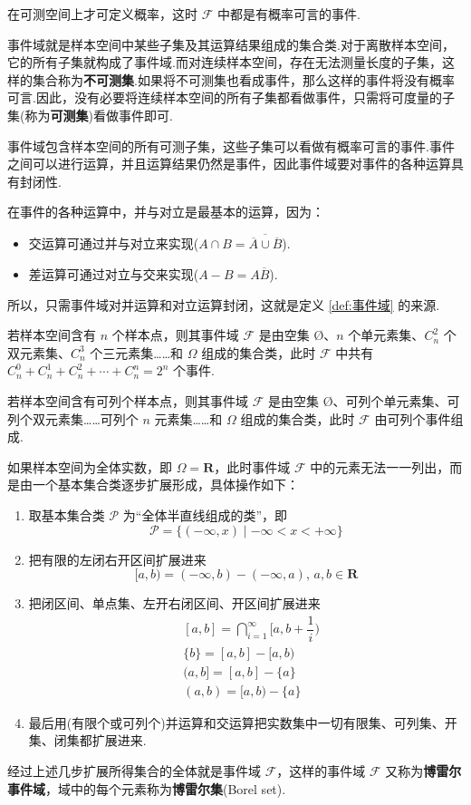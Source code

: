 在可测空间上才可定义概率，这时 $\mathcal{F}$ 中都是有概率可言的事件.

\begin{note}
    \indent 事件域就是样本空间中某些子集及其运算结果组成的集合类.对于离散样本空间，它的所有子集就构成了事件域.而对连续样本空间，存在无法测量长度的子集，这样的集合称为\textbf{不可测集}.如果将不可测集也看成事件，那么这样的事件将没有概率可言.因此，没有必要将连续样本空间的所有子集都看做事件，只需将可度量的子集(称为\textbf{可测集})看做事件即可.

    \indent 事件域包含样本空间的所有可测子集，这些子集可以看做有概率可言的事件.事件之间可以进行运算，并且运算结果仍然是事件，因此事件域要对事件的各种运算具有封闭性.

    \indent 在事件的各种运算中，并与对立是最基本的运算，因为：
    \begin{itemize}
        \item 交运算可通过并与对立来实现($A \cap B = \overline{\overline{A} \cup \overline{B}}$).
        \item 差运算可通过对立与交来实现($A-B = A \overline{B}$).
    \end{itemize}
    所以，只需事件域对并运算和对立运算封闭，这就是定义 \ref{def:事件域} 的来源.
\end{note}

若样本空间含有 $n$ 个样本点，则其事件域 $\mathcal{F}$ 是由空集 $\text{\O}$、$n$ 个单元素集、$C_n^2$ 个双元素集、$C_n^3$ 个三元素集……和 $\varOmega$ 组成的集合类，此时 $\mathcal{F}$ 中共有 $C_n^0 + C_n^1 + C_n^2 + \cdots + C_n^n = 2^n$ 个事件.

若样本空间含有可列个样本点，则其事件域 $\mathcal{F}$ 是由空集 $\text{\O}$、可列个单元素集、可列个双元素集……可列个 $n$ 元素集……和 $\varOmega$ 组成的集合类，此时 $\mathcal{F}$ 由可列个事件组成.

如果样本空间为全体实数，即 $\varOmega = \mathbf{R}$，此时事件域 $\mathcal{F}$ 中的元素无法一一列出，而是由一个基本集合类逐步扩展形成，具体操作如下：
\begin{enumerate}
    \item 取基本集合类 $\mathcal{P}$ 为“全体半直线组成的类”，即
    $$
    \mathcal{P} = \{ (-\infty, x) \mid -\infty < x < +\infty \}
    $$
    \item 把有限的左闭右开区间扩展进来
    $$
    [a,b) = (-\infty,b) - (-\infty,a), \, a,b \in \mathbf{R}
    $$
    \item 把闭区间、单点集、左开右闭区间、开区间扩展进来
    $$
    \begin{aligned}
        & [a,b] = \bigcap_{i=1}^{\infty} \Big[ a, b + \dfrac{1}{i} \Big) \\
        & \{ b \} = [a,b] - [a,b) \\
        & (a,b] = [a,b] - \{ a \} \\
        & (a,b) = [a,b) - \{ a \}
    \end{aligned}
    $$
    \item 最后用(有限个或可列个)并运算和交运算把实数集中一切有限集、可列集、开集、闭集都扩展进来.
\end{enumerate}
经过上述几步扩展所得集合的全体就是事件域 $\mathcal{F}$，这样的事件域 $\mathcal{F}$ 又称为\textbf{博雷尔事件域}，域中的每个元素称为\textbf{博雷尔集}(Borel set).

